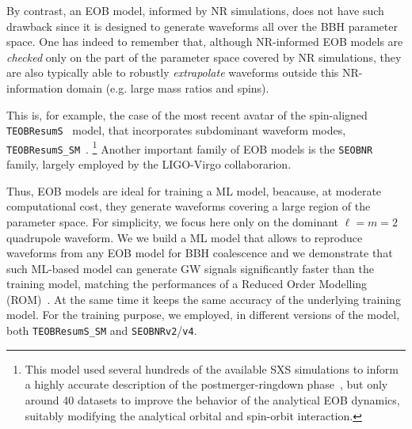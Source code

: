 By contrast, an EOB model, informed by NR simulations, does not have such drawback 
since it is designed to generate waveforms all over the BBH parameter space. 
One has indeed to remember that, although NR-informed EOB models are {\it checked} 
only on the part of the parameter space covered by NR simulations, 
they are also typically able to robustly {\it extrapolate} waveforms 
outside this NR-information domain (e.g. large mass ratios and
spins).
%
\par
This is, for example, the case of the most recent avatar of 
the spin-aligned \texttt{TEOBResumS}~\cite{Nagar:2018zoe} model, 
that incorporates subdominant waveform modes,  \texttt{TEOBResumS\_SM}~\cite{Nagar:2019wds,Nagar:2020pcj}. 
\footnote{This model used several hundreds of the available SXS simulations to inform a highly accurate description 
of the postmerger-ringdown phase~\cite{Damour:2014yha}, but 
only around 40 datasets to improve the behavior of the analytical EOB dynamics, 
suitably modifying the analytical orbital and spin-orbit interaction.}
Another important family of EOB models is the \texttt{SEOBNR} \cite{Taracchini:2013rva,Bohe:2016gbl} family, largely employed by the LIGO-Virgo collaborarion.
\par

Thus, EOB models are ideal for training a ML model, beacause, at moderate computational cost, they generate waveforms covering a large region of the parameter space.
For simplicity, we focus here only on the 
dominant $\ell=m=2$ quadrupole waveform. 
We we build a ML model that allows to reproduce waveforms from any EOB model for BBH coalescence and we demonstrate that such ML-based model can generate 
GW signals significantly faster than the training model, 
matching the performances of a Reduced Order Modelling 
(ROM)~\cite{Purrer:2015tud,Bohe:2016gbl,Purrer:2017str}.  
At the same time it keeps the same accuracy of the underlying 
training model.
For the training purpose, we employed, in different versions of the model, both \texttt{TEOBResumS\_SM} and \texttt{SEOBNRv2}/\texttt{v4}.

